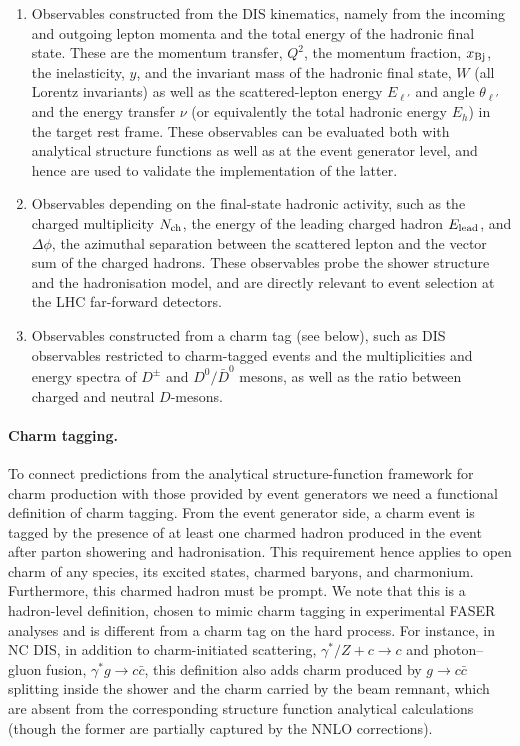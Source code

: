 \begin{enumerate}
  \item Observables constructed from the DIS kinematics, namely from the incoming and outgoing lepton momenta and the total energy  of the hadronic final state.
  These are the momentum transfer, $Q^2$, the momentum fraction, $x_{\rm Bj}$, the inelasticity, $y$, and the invariant mass of the hadronic final state, $W$ (all Lorentz invariants) as well as the scattered-lepton  energy $E_{\ell'}$ and angle $\theta_{\ell'}$  and the energy transfer $\nu$ (or equivalently the total hadronic energy $E_h$) in the target rest frame.
  These observables can be evaluated both with analytical structure functions as well as at the event generator level, and hence are used to validate the implementation of the latter. 

  \item Observables depending on the final-state hadronic activity, such as the charged multiplicity $N_{\rm ch}$, the energy of the leading charged hadron $E_{\rm lead}$, and $\Delta\phi$, the azimuthal separation between the scattered lepton and the vector sum of the charged hadrons.  
  These observables probe the shower structure and the hadronisation model, and are directly relevant to event selection at the LHC far-forward detectors. 

  \item Observables constructed from a charm tag (see below), such as DIS observables restricted to charm-tagged events and the 
   multiplicities and energy spectra of $D^\pm$ and $D^0/\bar{D}^0$ mesons, as well as the ratio between charged and neutral $D$-mesons.  
      
\end{enumerate}

\paragraph{Charm tagging.}
\label{sec:charmdef}
%
To connect predictions from the analytical structure-function framework for charm production with those provided by event generators we need a functional definition of charm tagging. 
%
From the event generator side, a charm event is tagged by the presence of at least one charmed hadron produced in the event after parton showering and hadronisation.
%
This requirement hence applies to open charm of any species, its excited
states, charmed baryons, and charmonium.
%
Furthermore, this charmed hadron must be prompt. 
%
We note that this is a hadron-level definition, chosen to mimic charm tagging in experimental FASER analyses and is different from a charm tag 
on the hard process.
%
For instance, in NC DIS, in addition to charm-initiated scattering, $\gamma^*/Z + c \to c$ and photon--gluon fusion, $\gamma^* g \to c\bar{c}$, this definition also adds charm produced by $g \to c\bar{c}$ splitting inside the shower and the charm carried by the beam remnant, which are absent from the corresponding structure function analytical calculations (though the former are partially captured by the NNLO corrections). 


